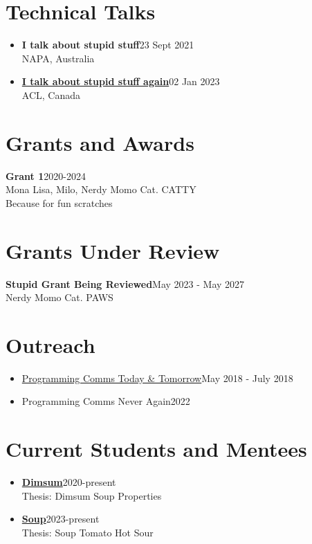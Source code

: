 \section{Technical Talks}
\begin{itemize}
[leftmargin=0pt,parsep=3pt,itemsep=0pt,topsep=0pt,partopsep=0pt]

\item[] {\textbf{I talk about stupid stuff}}\hfill {23 Sept 2021}\\
NAPA, Australia
\item[] \href{www.stupidstuff.com/mytalk}{\textbf{I talk about stupid stuff again}}\hfill {02 Jan 2023}\\
ACL, Canada

\end{itemize}

\section{Grants and Awards}

{\textbf{Grant 1}}\hfill {2020-2024}\\
Mona Lisa, Milo, Nerdy Momo Cat. CATTY\\
Because for fun scratches


\section{Grants Under Review}

\textbf{Stupid Grant Being Reviewed}\hfill {May 2023 - May 2027}\\
Nerdy Momo Cat. PAWS\\



\section{Outreach}
\begin{itemize}
[leftmargin=0pt,parsep=3pt,itemsep=0pt,topsep=0pt,partopsep=0pt]

\item[] \href{www.programmingcomms.com}{Programming Comms Today \& Tomorrow}\hfill {May 2018 - July 2018}
\item[] {Programming Comms Never Again}\hfill {2022}

\end{itemize}

\section{Current Students and Mentees}
\begin{itemize}
[leftmargin=0pt,parsep=3pt,itemsep=0pt,topsep=0pt,partopsep=0pt]

\item[] \href{www.dimsum.com}{\textbf{Dimsum}}\hfill {2020-present}\\Thesis: Dimsum Soup Properties
\item[] \href{www.soup.com}{\textbf{Soup}}\hfill {2023-present}\\Thesis: Soup Tomato Hot Sour

\end{itemize}

